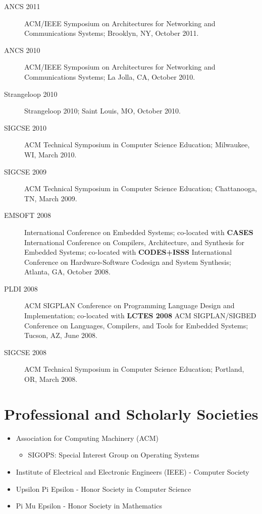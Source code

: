 \documentclass[12pt]{article}
\begin{document}
\begin{description}
    \item[ANCS 2011] ACM/IEEE Symposium on Architectures for Networking and
    Communications Systems; Brooklyn, NY, October 2011.

    \item[ANCS 2010] ACM/IEEE Symposium on Architectures for Networking and
    Communications Systems; La Jolla, CA, October 2010.

    \item[Strangeloop 2010] Strangeloop 2010; Saint Louis, MO, October
    2010.

	\item[SIGCSE 2010] ACM Technical Symposium in Computer Science
	Education; Milwaukee, WI, March 2010.

	\item[SIGCSE 2009] ACM Technical Symposium in Computer Science
	Education; Chattanooga, TN, March 2009.

	\item[EMSOFT 2008] International Conference on Embedded Systems;
	co-located with {\bf CASES} International Conference on Compilers,
	Architecture, and Synthesis for Embedded Systems; co-located with {\bf
	CODES+ISSS} International Conference on Hardware-Software Codesign and
	System Synthesis; Atlanta, GA, October 2008.

	\item[PLDI 2008] ACM SIGPLAN Conference on Programming Language Design
	and Implementation; co-located with {\bf LCTES 2008} ACM SIGPLAN/SIGBED
	Conference on Languages, Compilers, and Tools for Embedded Systems;
	Tucson, AZ, June 2008.

	\item[SIGCSE 2008] ACM Technical Symposium in Computer Science
	Education; Portland, OR, March 2008.
\end{description}

\section*{Professional and Scholarly Societies}
\begin{itemize}
	\item Association for Computing Machinery (ACM)
	\begin{itemize}
		\item SIGOPS: Special Interest Group on Operating Systems
	\end{itemize}
	\item Institute of Electrical and Electronic Engineers (IEEE) -
	Computer Society
	\item Upsilon Pi Epsilon - Honor Society in Computer Science
	\item Pi Mu Epsilon - Honor Society in Mathematics
\end{itemize}
\end{document}
